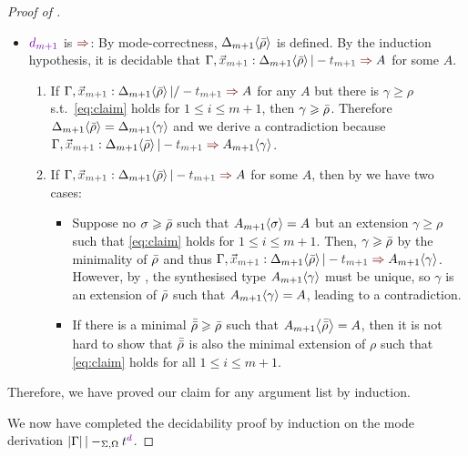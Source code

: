 \begin{proof}[Proof of {}]
\begin{itemize}
\begin{claimproof}
\begin{enumerate}
\begin{enumerate}
\begin{itemize}
                  \item $\dir{d_{m+1}}$ is $\syn$: By mode-correctness, ${\Delta_{m+1}}\!\left<{\bar{\rho}}\right>$ is defined.
                    By the induction hypothesis, it is decidable that $\Gamma, \vars{x}_\isTerm{m+1} : \simsub{\Delta_{m+1}}{\ext{\rho}} |- \isTerm{t_{m+1}} \syn A$ for some $A$.
                    \begin{enumerate}
                      \item If $\Gamma, \vars{x}_\isTerm{m+1} : \simsub{\Delta_{m+1}}{\ext{\rho}} |/- \isTerm{t_{m+1}} \syn A$ for any $A$ but there is $\gamma \geq \rho$ s.t.\ \eqref{eq:claim} holds for $1 \leq i \leq m+1$, then $\gamma \geqslant \bar{\rho}$.
                        Therefore ${\Delta_{m+1}}\!\left<{\bar{\rho}}\right> = {\Delta_{m+1}}\!\left<{\gamma}\right>$ and we derive a contradiction because $\Gamma, \vars{x}_\isTerm{m+1} : \simsub{\Delta_{m+1}}{\ext{\rho}} |- \isTerm{t_{m+1}} \syn \simsub{A_{m+1}}{\gamma}$.
                      \item If $\Gamma, \vars{x}_\isTerm{m+1} : \simsub{\Delta_{m+1}}{\ext{\rho}} |- \isTerm{t_{m+1}} \syn A$ for some $A$, then by  we have two cases: %
                        \begin{itemize}
                          \item Suppose no $\sigma \geqslant \bar{\rho}$ such that ${A_{m+1}}\!\left<{\sigma}\right> = A$ but an extension $\gamma \geq \rho$ such that \eqref{eq:claim} holds for $1 \leq i \leq m + 1$. 
                            Then, $\gamma \geqslant \bar{\rho}$ by the minimality of $\bar{\rho}$ and thus
                            $\Gamma, \vars{x}_\isTerm{m+1} : \simsub{\Delta_{m+1}}{\ext{\rho}} |- \isTerm{t_{m+1}} \syn \simsub{A_{m+1}}{\gamma}$.
                            However, by , the synthesised type ${A_{m+1}}\!\left<{\gamma}\right>$ must be unique, so $\gamma$ is an extension of $\bar{\rho}$ such that ${A_{m+1}}\!\left<{\gamma}\right> = A$, leading to a contradiction.
                          \item If there is a minimal $\bar{\bar{\rho}} \geqslant \bar{\rho}$ such that ${A_{m+1}}\!\left<{\bar{\bar{\rho}}}\right> = A$, then it is not hard to show that $\bar{\bar{\rho}}$ is also the minimal extension of $\rho$ such that \eqref{eq:claim} holds for all $1 \leq i \leq m + 1$.
                        \end{itemize}
                    \end{enumerate}
                \end{itemize}
            \end{enumerate}
        \end{enumerate}
        Therefore, we have proved our claim for any argument list by induction.
      \end{claimproof}
  \end{itemize}
  We now have completed the decidability proof by induction on the mode derivation $\erase{\Gamma} |-_{\Sigma, \Omega} t^{\dir{d}}$.
\end{proof}

